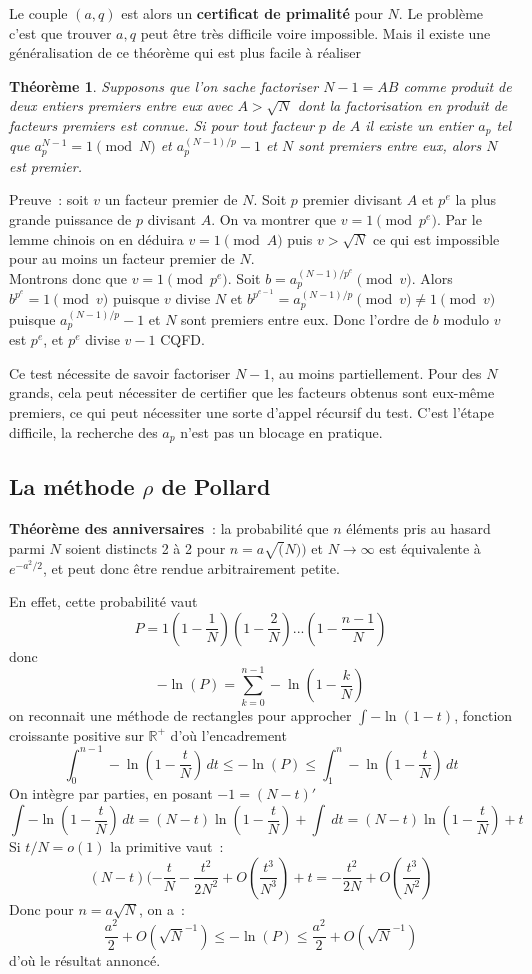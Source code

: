 \documentclass[a4paper,11pt]{article}
\newtheorem{thm}{Théorème}
\begin{document}
\begin{giacjshere}
Le couple $(a,q)$ est alors un 
{\bf certificat de primalit\'e} pour $N$.
Le probl\`eme c'est que trouver $a,q$ peut \^etre tr\`es difficile
voire impossible. Mais il existe une g\'en\'eralisation de ce
th\'eor\`eme qui est plus facile \`a r\'ealiser
\begin{thm}
Supposons que l'on sache factoriser $N-1=AB$ comme produit de deux entiers
premiers entre eux avec $A>\sqrt{N}$ dont la factorisation en produit
de facteurs premiers est connue. Si pour tout facteur $p$ de $A$ il
existe un entier $a_p$ tel que $a_p^{N-1}=1 \pmod N$ et
$a_p^{(N-1)/p}-1$ et $N$ sont premiers entre eux, alors $N$ est premier.
\end{thm}
Preuve~: soit $v$ un facteur premier de $N$. 
Soit $p$ premier divisant $A$ et $p^e$ la plus grande
puissance de $p$ divisant $A$. On va montrer que $v=1 \pmod{p^e}$.
Par le lemme chinois on en d\'eduira $v=1 \pmod A$ puis $v>\sqrt{N}$
ce qui est impossible pour au moins un facteur premier de $N$.\\
Montrons donc que $v=1 \pmod{p^e}$. Soit $b=a_p^{(N-1)/p^e} \pmod v$. Alors $b^{p^e}=1 \pmod v$
puisque $v$ divise $N$ et $b^{p^{e-1}} = a_p^{(N-1)/p} \pmod v \neq 1
\pmod v$ puisque $a_p^{(N-1)/p}-1$ et $N$ sont premiers entre eux.
Donc l'ordre de $b$ modulo $v$ est $p^e$, et $p^e$ divise $v-1$ CQFD.

Ce test n\'ecessite de savoir factoriser $N-1$, au moins
partiellement. Pour des $N$ grands, cela peut n\'ecessiter
de certifier que les facteurs obtenus sont eux-m\^eme premiers,
ce qui peut n\'ecessiter une sorte d'appel r\'ecursif du test. C'est
l'\'etape difficile, la recherche des $a_p$ n'est pas un blocage en pratique.

\subsection{La m\'ethode $\rho$ de Pollard} 
{\bf Théorème des anniversaires~}: la probabilit\'e que $n$ éléments pris au
hasard parmi $N$ soient distincts 2 à 2 pour 
$n=a \sqrt(N))$ et $N\rightarrow \infty$ 
est \'equivalente \`a $e^{-a^2/2}$, 
et peut donc être rendue arbitrairement petite.

En effet, cette probabilit\'e vaut
$$ P=1(1-\frac1N)(1-\frac2N)...(1-\frac{n-1}{N})$$
donc
$$ -\ln(P)=\sum_{k=0}^{n-1} -\ln(1-\frac{k}{N})  $$
on reconnait une m\'ethode de rectangles pour approcher $\int
-\ln(1-t)$, fonction croissante positive sur $\mathbb{R}^+$ d'o\`u l'encadrement
$$ \int_{0}^{n-1} -\ln(1-\frac{t}{N}) \, dt \leq -\ln(P) \leq
\int_{1}^{n} -\ln(1-\frac{t}{N})  \, dt $$
On int\`egre par parties, en posant $-1=(N-t)'$ 
$$ \int -\ln(1-\frac{t}{N}) \, dt 
= (N-t) \ln(1-\frac{t}{N}) + \int \ dt 
= (N-t) \ln(1-\frac{t}{N}) + t $$
Si $t/N=o(1)$ la primitive vaut~:
$$ (N-t)(-\frac{t}{N}-\frac{t^2}{2N^2}+O(\frac{t^3}{N^3})+t
=-\frac{t^2}{2N} + O(\frac{t^3}{N^2}) $$
Donc pour $n=a\sqrt{N}$, on a~:
$$ \frac{a^2}{2}+ O(\sqrt{N}^{-1})
\leq -\ln(P) 
\leq \frac{a^2}{2}+ O(\sqrt{N}^{-1})$$
d'o\`u le r\'esultat annonc\'e.


\end{giacjshere}
\end{document}
